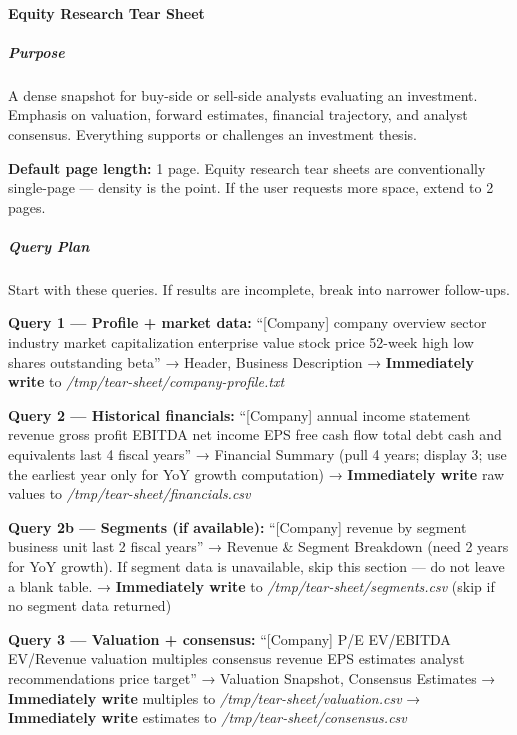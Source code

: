 \documentclass[11pt]{article}
\begin{document}
\paragraph{Equity Research Tear Sheet}\mbox{}\par

\subparagraph{Purpose}\mbox{}\par
A dense snapshot for buy-side or sell-side analysts evaluating an investment. Emphasis on valuation, forward estimates, financial trajectory, and analyst consensus. Everything supports or challenges an investment thesis.


\textbf{Default page length:} 1 page. Equity research tear sheets are conventionally single-page — density is the point. If the user requests more space, extend to 2 pages.


\subparagraph{Query Plan}\mbox{}\par

Start with these queries. If results are incomplete, break into narrower follow-ups.


\textbf{Query 1 — Profile + market data:} ``[Company] company overview sector industry market capitalization enterprise value stock price 52-week high low shares outstanding beta'' → Header, Business Description → \textbf{Immediately write} to \emph{/tmp/tear-sheet/company-profile.txt}


\textbf{Query 2 — Historical financials:} ``[Company] annual income statement revenue gross profit EBITDA net income EPS free cash flow total debt cash and equivalents last 4 fiscal years'' → Financial Summary (pull 4 years; display 3; use the earliest year only for YoY growth computation) → \textbf{Immediately write} raw values to \emph{/tmp/tear-sheet/financials.csv}


\textbf{Query 2b — Segments (if available):} ``[Company] revenue by segment business unit last 2 fiscal years'' → Revenue \& Segment Breakdown (need 2 years for YoY growth). If segment data is unavailable, skip this section — do not leave a blank table. → \textbf{Immediately write} to \emph{/tmp/tear-sheet/segments.csv} (skip if no segment data returned)


\textbf{Query 3 — Valuation + consensus:} ``[Company] P/E EV/EBITDA EV/Revenue valuation multiples consensus revenue EPS estimates analyst recommendations price target'' → Valuation Snapshot, Consensus Estimates → \textbf{Immediately write} multiples to \emph{/tmp/tear-sheet/valuation.csv} → \textbf{Immediately write} estimates to \emph{/tmp/tear-sheet/consensus.csv}
\end{document}
